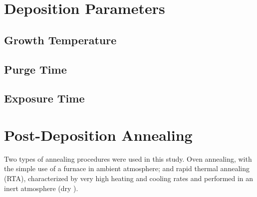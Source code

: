 \section{Deposition Parameters}

\lipsum


\subsection{Growth Temperature}

\lipsum


\subsection{Purge Time}

\lipsum


\subsection{Exposure Time}

\lipsum


\section{Post-Deposition Annealing}

Two types of annealing procedures were used in this study. Oven annealing, with the simple use of a furnace in ambient atmosphere; and rapid thermal annealing (RTA), characterized by very high heating and cooling rates and performed in an inert atmosphere (dry ). 








